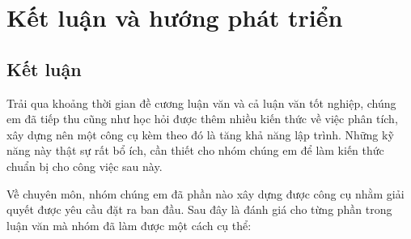 \setcounter{chapter}{5}
\chapter{Kết luận và hướng phát triển}

\section{Kết luận}
Trải qua khoảng thời gian đề cương luận văn và cả luận văn tốt nghiệp, chúng em đã tiếp thu cũng như học hỏi được thêm nhiều kiến thức về việc phân tích, xây dựng nên một công cụ kèm theo đó là tăng khả năng lập trình. Những kỹ năng này thật sự rất bổ ích, cần thiết cho nhóm chúng em để làm kiến thức chuẩn bị cho công việc sau này.

Về chuyên môn, nhóm chúng em đã phần nào xây dựng được công cụ nhằm giải quyết được yêu cầu đặt ra ban đầu. Sau đây là đánh giá cho từng phần trong luận văn mà nhóm đã làm được một cách cụ thể:

